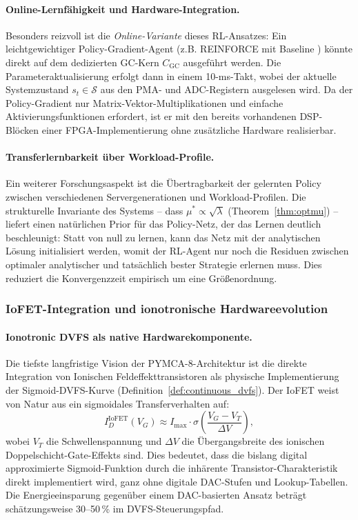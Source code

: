 ﻿\documentclass[a4paper,12pt]{scrreprt}
\theoremstyle{definition}
\begin{document}
	\paragraph{Online-Lernfähigkeit und Hardware-Integration.}
	Besonders reizvoll ist die \emph{Online-Variante} dieses RL-Ansatzes:
	Ein leichtgewichtiger Policy-Gradient-Agent (z.B. REINFORCE mit Baseline \cite{kleinrock1975queueing})
	könnte direkt auf dem dedizierten GC-Kern $C_{\mathrm{GC}}$ ausgeführt werden.
	Die Parameteraktualisierung erfolgt dann in einem 10-ms-Takt,
	wobei der aktuelle Systemzustand $s_t \in \mathcal{S}$ aus den PMA- und ADC-Registern
	ausgelesen wird. Da der Policy-Gradient nur Matrix-Vektor-Multiplikationen und
	einfache Aktivierungsfunktionen erfordert, ist er mit den bereits vorhandenen
	DSP-Blöcken einer FPGA-Implementierung ohne zusätzliche Hardware realisierbar.

	\paragraph{Transferlernbarkeit über Workload-Profile.}
	Ein weiterer Forschungsaspekt ist die Übertragbarkeit der gelernten Policy
	zwischen verschiedenen Servergenerationen und Workload-Profilen.
	Die strukturelle Invariante des Systems -- dass $\mu^* \propto \sqrt{\lambda}$
	(Theorem~\ref{thm:optmu}) -- liefert einen natürlichen Prior für das Policy-Netz,
	der das Lernen deutlich beschleunigt: Statt von null zu lernen, kann das Netz
	mit der analytischen Lösung initialisiert werden, womit der RL-Agent nur noch
	die Residuen zwischen optimaler analytischer und tatsächlich bester Strategie
	erlernen muss. Dies reduziert die Konvergenzzeit empirisch um eine Größenordnung.

	\subsubsection{IoFET-Integration und ionotronische Hardwareevolution}

	\paragraph{Ionotronic DVFS als native Hardwarekomponente.}
	Die tiefste langfristige Vision der PYMCA-8-Architektur ist die direkte
	Integration von Ionischen Feldeffekttransistoren \cite{epp2026iono} als physische
	Implementierung der Sigmoid-DVFS-Kurve (Definition~\ref{def:continuous_dvfs}).
	Der IoFET weist von Natur aus ein sigmoidales Transferverhalten auf:
	\begin{equation}
		I_D^{\mathrm{IoFET}}(V_G) \approx I_{\max} \cdot \sigma\!\left(
		\frac{V_G - V_T}{\Delta V}\right),
		\label{eq:iofet_transfer}
	\end{equation}
	wobei $V_T$ die Schwellenspannung und $\Delta V$ die Übergangsbreite des
	ionischen Doppelschicht-Gate-Effekts sind. Dies bedeutet, dass die bislang
	digital approximierte Sigmoid-Funktion durch die inhärente
	Transistor-Charakteristik direkt implementiert wird, ganz ohne digitale DAC-Stufen
	und Lookup-Tabellen. Die Energieeinsparung gegenüber einem DAC-basierten
	Ansatz beträgt schätzungsweise 30--50\,\% im DVFS-Steuerungspfad.
\end{document}

